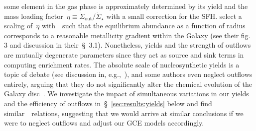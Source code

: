 \documentclass[ms.tex]{subfiles}
\begin{document}
some element in the gas phase is approximately determined by its yield and the
mass loading factor~$\eta \equiv \dot{\Sigma}_\text{out} / \dot{\Sigma}_\star$
with a small correction for the SFH.
\citet{Johnson2021} select a scaling of~$\eta$ with~\rgal~such that the
equilibrium abundance as a function of radius corresponds to a reasonable
metallicity gradient within the Galaxy (see their fig. 3 and discussion in
their~\S~3.1).
Nonetheless, yields and the strength of outflows are mutually degenerate
parameters since they act as source and sink terms in computing enrichment
rates.
The absolute scale of nucleosynthetic yields is a topic of debate (see
discussion in, e.g.,~\citealp{Griffith2021}), and some authors even neglect
outflows entirely, arguing that they do not significantly alter the chemical
evolution of the Galaxy disc~\citep[e.g.][]{Spitoni2019, Spitoni2021}.
We investigate the impact of simultaneous variations in our yields and the
efficiency of outflows in~\S~\ref{sec:results:yields} below
{\color{red} and find similar~\ohno~relations, suggesting that we would arrive
at similar conclusions if we were to neglect outflows and adjust our GCE models
accordingly.}
\end{document}

